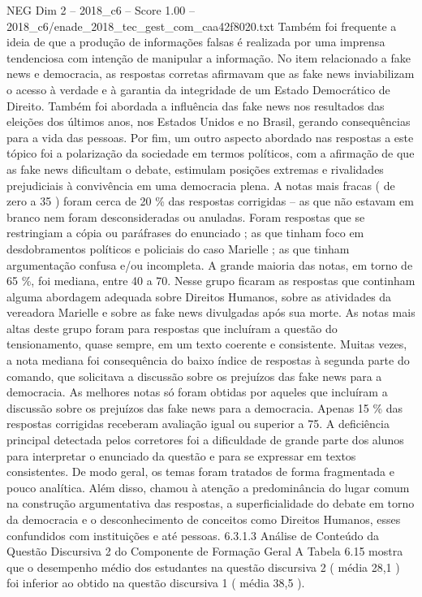 \begin{textsample}{NEG Dim 2 – 2018\_c6 – Score 1.00 – 2018\_c6/enade\_2018\_tec\_gest\_com\_caa42f8020.txt}
Também foi frequente a ideia de que a produção de informações falsas é realizada por uma imprensa tendenciosa com intenção de manipular a informação.
No item relacionado a fake news e democracia, as respostas corretas afirmavam que as fake news inviabilizam o acesso à verdade e à garantia da integridade de um Estado Democrático de Direito.
Também foi abordada a influência das fake news nos resultados das eleições dos últimos anos, nos Estados Unidos e no Brasil, gerando consequências para a vida das pessoas.
Por fim, um outro aspecto abordado nas respostas a este tópico foi a polarização da sociedade em termos políticos, com a afirmação de que as fake news dificultam o debate, estimulam posições extremas e rivalidades prejudiciais à convivência em uma democracia plena.
A notas mais fracas ( de zero a 35 ) foram cerca de 20 \% das respostas corrigidas – as que não estavam em branco nem foram desconsideradas ou anuladas.
Foram respostas que se restringiam a cópia ou paráfrases do enunciado ; as que tinham foco em desdobramentos políticos e policiais do caso Marielle ; as que tinham argumentação confusa e/ou incompleta.
A grande maioria das notas, em torno de 65 \%, foi mediana, entre 40 a 70.
Nesse grupo ficaram as respostas que continham alguma abordagem adequada sobre Direitos Humanos, sobre as atividades da vereadora Marielle e sobre as fake news divulgadas após sua morte.
As notas mais altas deste grupo foram para respostas que incluíram a questão do tensionamento, quase sempre, em um texto coerente e consistente.
Muitas vezes, a nota mediana foi consequência do baixo índice de respostas à segunda parte do comando, que solicitava a discussão sobre os prejuízos das fake news para a democracia.
As melhores notas só foram obtidas por aqueles que incluíram a discussão sobre os prejuízos das fake news para a democracia.
Apenas 15 \% das respostas corrigidas receberam avaliação igual ou superior a 75.
A deficiência principal detectada pelos corretores foi a dificuldade de grande parte dos alunos para interpretar o enunciado da questão e para se expressar em textos consistentes.
De modo geral, os temas foram tratados de forma fragmentada e pouco analítica.
Além disso, chamou à atenção a predominância do lugar comum na construção argumentativa das respostas, a superficialidade do debate em torno da democracia e o desconhecimento de conceitos como Direitos Humanos, esses confundidos com instituições e até pessoas. 6.3.1.3 Análise de Conteúdo da Questão Discursiva 2 do Componente de Formação Geral A Tabela 6.15 mostra que o desempenho médio dos estudantes na questão discursiva 2 ( média 28,1 ) foi inferior ao obtido na questão discursiva 1 ( média 38,5 ).

\end{textsample}
